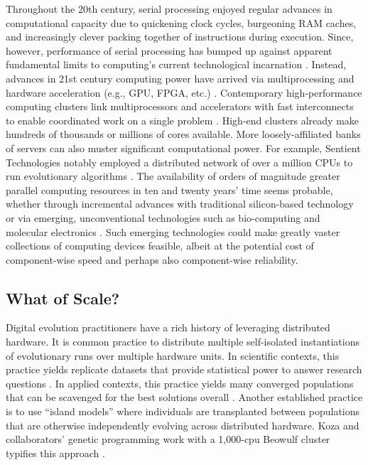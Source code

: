 Throughout the 20th century, serial processing enjoyed regular advances in computational capacity due to quickening clock cycles, burgeoning RAM caches, and increasingly clever packing together of instructions during execution.
Since, however, performance of serial processing has bumped up against apparent fundamental limits to computing’s current technological incarnation \cite{sutter2005free}.
Instead, advances in 21st century computing power have arrived via multiprocessing \cite[p.~55]{hennessy2011computer} and hardware acceleration (e.g., GPU, FPGA, etc.) \cite{che2008accelerating}.
Contemporary high-performance computing clusters link multiprocessors and accelerators with fast interconnects to enable coordinated work on a single problem \cite[p.~436]{hennessy2011computer}.
High-end clusters already make hundreds of thousands or millions of cores available. More loosely-affiliated banks of servers can also muster significant computational power.
For example, Sentient Technologies notably employed a distributed network of over a million CPUs to run evolutionary algorithms \cite{miikkulainen2019evolving}.
The availability of orders of magnitude greater parallel computing resources in ten and twenty years’ time seems probable, whether through incremental advances with traditional silicon-based technology or via emerging, unconventional technologies such as bio-computing \cite{benenson2009biocomputers} and molecular electronics \cite{xiang2016molecular}.
Such emerging technologies could make greatly vaster collections of computing devices feasible, albeit at the potential cost of component-wise speed \cite{bonnet2013amplifying, ellenbogen2000architectures} and perhaps also component-wise reliability.

\subsection{What of Scale?}

Digital evolution practitioners have a rich history of leveraging distributed hardware.
It is common practice to distribute multiple self-isolated instantiations of evolutionary runs over multiple hardware units.
In scientific contexts, this practice yields replicate datasets that provide statistical power to answer research questions \cite{dolson2017spatial}.
In applied contexts, this practice yields many converged populations that can be scavenged for the best solutions overall \cite{hornby2006automated}.
Another established practice is to use “island models” where individuals are transplanted between populations that are otherwise independently evolving across distributed hardware.
Koza and collaborators’ genetic programming work with a 1,000-cpu Beowulf cluster typifies this approach \cite{bennett1999building}.

